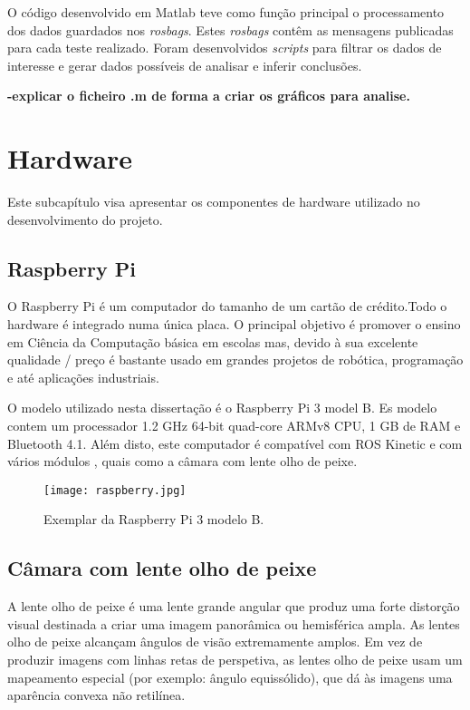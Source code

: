 O código desenvolvido em Matlab teve como função principal o processamento dos dados guardados nos \textit{rosbags}. Estes \textit{rosbags} contêm as mensagens publicadas para cada teste realizado. Foram desenvolvidos \textit{scripts} para filtrar os dados de interesse e gerar dados possíveis de analisar e inferir conclusões.

 \textbf{-explicar o ficheiro .m de forma a criar os gráficos para analise.}

\section{Hardware}

Este subcapítulo visa apresentar os componentes de hardware utilizado no desenvolvimento do projeto.

\subsection{Raspberry Pi}

O Raspberry Pi é um computador do tamanho de um cartão de crédito.Todo o hardware é integrado numa única placa. O principal objetivo é promover o ensino em Ciência da Computação básica em escolas mas, devido à sua excelente qualidade / preço é bastante usado em grandes projetos de robótica, programação e até aplicações industriais. 

O modelo utilizado nesta dissertação é o Raspberry Pi 3 model B. Es modelo contem um processador 1.2 GHz 64-bit quad-core ARMv8 CPU, 1 GB de RAM e Bluetooth 4.1. Além disto, este computador é compatível com ROS Kinetic e com vários módulos , quais como a câmara com lente olho de peixe.

\begin{figure}[h!] %
	\begin{center}
		\leavevmode		
		\texttt{[image: raspberry.jpg]}
		\caption{Exemplar da Raspberry Pi 3 modelo B.}
		\label{fig:raspberry}
	\end{center}
\end{figure}

\subsection{Câmara com lente olho de peixe}

A lente olho de peixe é uma lente grande angular que produz uma forte distorção visual destinada a criar uma imagem panorâmica ou hemisférica ampla. As lentes olho de peixe alcançam ângulos de visão extremamente amplos. Em vez de produzir imagens com linhas retas de perspetiva, as lentes olho de peixe usam um mapeamento especial (por exemplo: ângulo equissólido), que dá às imagens uma aparência convexa não retilínea.

